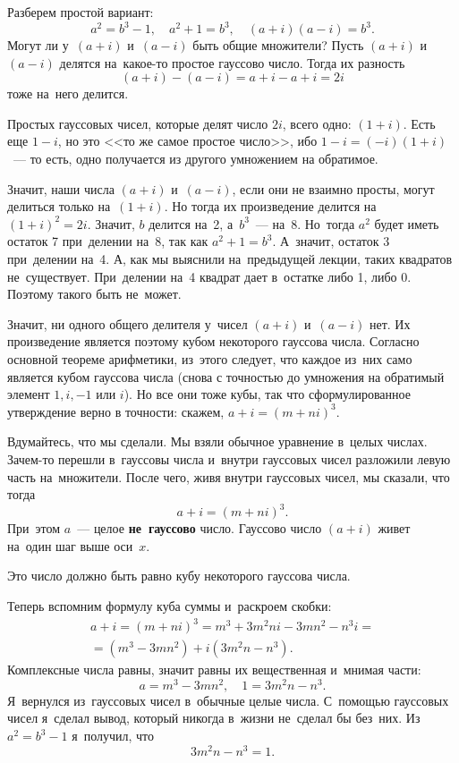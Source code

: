 Разберем простой вариант:
$$
a^{2}=b^{3}-1,\quad
a^{2}+1=b^{3},\quad
(a+i)(a-i)=b^{3}.
$$
Могут ли у~$(a+i)$ и~$(a-i)$ быть общие множители? Пусть $(a+i)$ и~$(a-i)$ делятся на~какое-то простое
гауссово число. Тогда их разность $$(a+i)-(a-i)=a+i-a+i=2i$$ тоже на~него делится.

Простых гауссовых чисел, которые делят число $2i$, всего одно: $(1+i)$. Есть еще $1-i$, но это <<то же самое простое число>>, ибо
$1-i=(-i)(1+i)$~--- то есть, одно получается из другого умножением на обратимое.

Значит, наши числа $(a+i)$ и~$(a-i)$, если они не взаимно просты, могут делиться только на~$(1+i)$. Но тогда их произведение делится
на~$(1+i)^{2}=2i$. Значит, $b$ делится на~2, а~$b^{3}$~--- на~8. Но~тогда $a^{2}$ будет иметь остаток 7 при~делении
на~8, так как $a^{2}+1=b^{3}$. А~значит, остаток 3 при~делении на~4. А, как мы выяснили на~предыдущей
лекции, таких квадратов не~существует. При~делении на~4 квадрат дает в~остатке либо 1, либо 0.
Поэтому такого быть не~может.

Значит, ни одного общего делителя у~чисел $(a+i)$ и~$(a-i)$ нет. Их произведение является поэтому кубом
некоторого гауссова числа. Согласно основной теореме арифметики, из~этого следует, что каждое
из~них само является кубом гауссова числа (снова с точностью до умножения на обратимый элемент $1,i,-1$ или $i$).
Но все они тоже кубы, так что сформулированное утверждение верно в точности: скажем, $a+i =(m+ni)^{3}$.

Вдумайтесь, что мы сделали. Мы взяли обычное уравнение в~целых числах. Зачем-то перешли в~гауссовы
числа и~внутри гауссовых чисел разложили левую часть на~множители. После чего, живя внутри
гауссовых чисел, мы сказали, что тогда $$a+i =(m+ni)^{3}.$$ При~этом $a$~--- целое \textbf{не~гауссово} число.
Гауссово число $(a+i)$ живет на~один шаг выше оси~$x$.

Это число должно быть равно кубу некоторого гауссова числа.

Теперь вспомним формулу куба суммы и~раскроем скобки:
\begin{multline*}
a+i =(m+ni)^{3}=
m^{3}+3m^{2}ni-3mn^{2}-n^{3}i=
\\=
(m^{3}-3mn^{2})+i(3m^{2}n-n^{3}).
\end{multline*}
Комплексные числа равны, значит равны их вещественная и~мнимая части:
$$
a=m^{3}-3mn^{2},\quad
1=3m^{2}n-n^{3}.
$$
Я~вернулся из~гауссовых чисел в~обычные целые числа. С~помощью гауссовых чисел я~сделал вывод,
который никогда в~жизни не~сделал бы без~них. Из~$a^{2}=b^{3}-1$ я~получил, что $$3m^{2}n-n^{3}=1.$$

